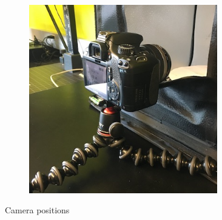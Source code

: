 \documentclass[10pt,letter,english]{article}
\begin{document}
\begin{figure}[H]
\begin{subfigure}[t]{.33\textwidth}
  \caption{}
  \label{}
\end{subfigure}%
\begin{subfigure}[t]{.33\textwidth}
  \centering
  \includegraphics[width=0.9\textwidth]{Figures/camera_position_3.JPG}
  \caption{}
  \label{}
\end{subfigure}
\caption{Camera positions}
\label{flowerplacement_2}
\end{figure}
\end{document}
